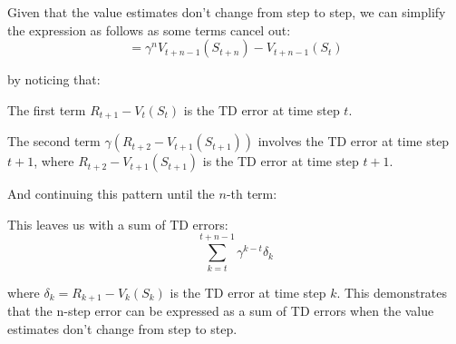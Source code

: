\documentclass{article}
\begin{document}
Given that the value estimates don't change from step to step, we can simplify the expression as follows as some terms cancel out:
\[ = \gamma^n V_{t+n-1}(S_{t+n}) - V_{t+n-1}(S_t) \]

by noticing that:

The first term \(R_{t+1} - V_{t}(S_t)\) is the TD error at time step \(t\).

The second term \(\gamma(R_{t+2} - V_{t+1}(S_{t+1}))\)
 involves the TD error at time step \(t+1\),
  where \(R_{t+2} - V_{t+1}(S_{t+1})\) is the TD error at time step \(t+1\).

And continuing this pattern until the \(n\)-th term:

This leaves us with a sum of TD errors:
\[ \sum_{k=t}^{t+n-1} \gamma^{k-t} \delta_k \]

where \( \delta_k = R_{k+1} - V_k(S_k) \) is the TD error at time step \(k\). This demonstrates that the n-step error can be expressed as a sum of TD errors when the value estimates don't change from step to step.
\end{document}
